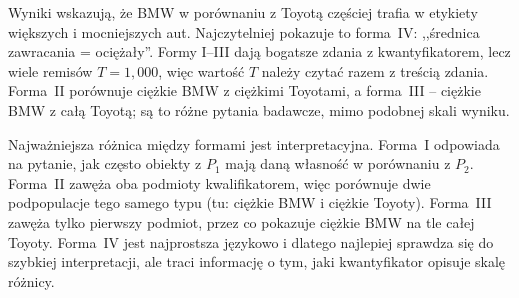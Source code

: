 \documentclass{article}
\begin{document}
\begin{table}[H]
\centering
\caption{Najlepsze podsumowania wielopodmiotowe (TOP 1 dla każdej formy) dla porównania BMW
($P_1$) i Toyoty ($P_2$). Kolumna ,,forma'' wskazuje jedną z czterech
postaci podsumowań wielopodmiotowych, kolumna $T$ -- stopień prawdziwości
zdania, a ostatnia kolumna podaje zdanie wygenerowane przez aplikację.
Wiele wartości $T=1{,}000$ oznacza, że dany stosunek stopni spełnienia
idealnie wpada w nośnik użytego kwantyfikatora; nie należy tego czytać
jako samodzielnej miary istotności bez interpretacji treści zdania.}
\label{tab:multi-bmw-toyota}
\setlength{\tabcolsep}{3pt}
\end{table}

Wyniki wskazują, że BMW w porównaniu z Toyotą częściej trafia w etykiety
większych i mocniejszych aut. Najczytelniej pokazuje to forma~IV:
,,średnica zawracania = ociężały''.
Formy I--III dają bogatsze zdania
z kwantyfikatorem, lecz wiele remisów $T=1{,}000$, więc wartość $T$ należy
czytać razem z treścią zdania. Forma~II porównuje ciężkie BMW z ciężkimi
Toyotami, a forma~III -- ciężkie BMW z całą Toyotą; są to różne pytania
badawcze, mimo podobnej skali wyniku.

Najważniejsza różnica między formami jest interpretacyjna. Forma~I odpowiada
na pytanie, jak często obiekty z $P_1$ mają daną własność w porównaniu z
$P_2$. Forma~II zawęża oba podmioty kwalifikatorem, więc porównuje dwie
podpopulacje tego samego typu (tu: ciężkie BMW i ciężkie Toyoty). Forma~III
zawęża tylko pierwszy podmiot, przez co pokazuje ciężkie BMW na tle całej
Toyoty. Forma~IV jest najprostsza językowo i dlatego najlepiej sprawdza się
do szybkiej interpretacji, ale traci informację o tym, jaki kwantyfikator
opisuje skalę różnicy.
\end{document}
